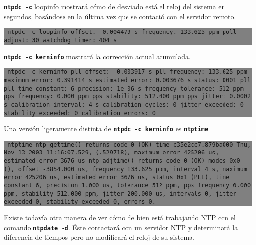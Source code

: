 \documentclass[12pt]{article}
\begin{document}
	
\texttt{\textbf{ntpdc -c}} loopinfo mostrará cómo de desviado está el reloj del sistema
en segundos, basándose en la última vez que se contactó con el servidor 
remoto.



\colorbox{grey}{\parbox[t]{0.95\linewidth}{ \vspace*{0.5cm} {\tt 
ntpdc -c loopinfo
offset:               -0.004479 s
frequency:            133.625 ppm
poll adjust:          30
watchdog timer:       404 s
 } \vspace*{0.5cm} } } 

	
\texttt{\textbf{ntpdc -c kerninfo}}  mostrará la corrección actual acumulada.


\colorbox{grey}{\parbox[t]{0.95\linewidth}{ \vspace*{0.5cm} {\tt 
ntpdc -c kerninfo
pll offset:           -0.003917 s
pll frequency:        133.625 ppm
maximum error:        0.391414 s
estimated error:      0.003676 s
status:               0001  pll
pll time constant:    6
precision:            1e-06 s
frequency tolerance:  512 ppm
pps frequency:        0.000 ppm
pps stability:        512.000 ppm
pps jitter:           0.0002 s
calibration interval: 4 s
calibration cycles:   0
jitter exceeded:      0
stability exceeded:   0
calibration errors:   0
 } \vspace*{0.5cm} } } 

	
Una versión ligeramente distinta de \texttt{\textbf{ntpdc -c kerninfo}} es \texttt{\textbf{ntptime}}


\colorbox{grey}{\parbox[t]{0.95\linewidth}{ \vspace*{0.5cm} {\tt 
ntptime
ntp\_gettime() returns code 0 (OK)
  time c35e2cc7.879ba000  Thu, Nov 13 2003 11:16:07.529, (.529718),
  maximum error 425206 us, estimated error 3676 us
ntp\_adjtime() returns code 0 (OK)
  modes 0x0 (),
  offset -3854.000 us, frequency 133.625 ppm, interval 4 s,
  maximum error 425206 us, estimated error 3676 us,
  status 0x1 (PLL),
  time constant 6, precision 1.000 us, tolerance 512 ppm,
  pps frequency 0.000 ppm, stability 512.000 ppm, jitter 200.000 us,
  intervals 0, jitter exceeded 0, stability exceeded 0, errors 0.
 } \vspace*{0.5cm} } } 

	
	
	

Existe todavía otra manera de ver cómo de bien está trabajando NTP con 
el comando \texttt{\textbf{ntpdate -d}}. Éste contactará con un servidor NTP y
determinará la diferencia de tiempos pero no modificará el reloj de su sistema.
\end{document}
